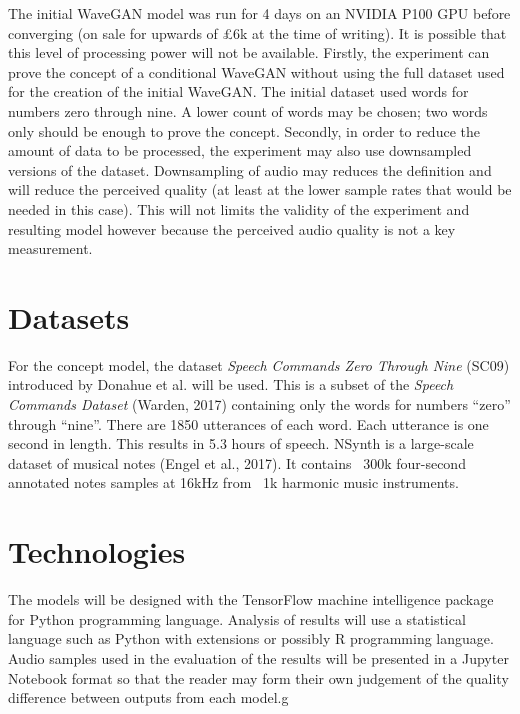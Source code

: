 \documentclass{article}
\begin{document}
The initial WaveGAN model was run for 4 days on an NVIDIA P100 GPU before converging (on sale for upwards of £6k at the time of writing).
It is possible that this level of processing power will not be available.
\newline
\newline
Firstly, the experiment can prove the concept of a conditional WaveGAN without using the full dataset used for the creation of the initial WaveGAN.
The initial dataset used words for numbers zero through nine.
A lower count of words may be chosen; two words only should be enough to prove the concept.
\newline
\newline
Secondly, in order to reduce the amount of data to be processed, the experiment may also use downsampled versions of the dataset.
Downsampling of audio may reduces the definition and will reduce the perceived quality (at least at the lower sample rates that would be needed in this case).
This will not limits the validity of the experiment and resulting model however because the perceived audio quality is not a key measurement.

\section{Datasets}

For the concept model, the dataset \textit{Speech Commands Zero Through Nine} (SC09) introduced by Donahue et al. will be used.
This is a subset of the \textit{Speech Commands Dataset} (Warden, 2017) containing only the words for numbers ``zero'' through ``nine''.
There are 1850 utterances of each word.
Each utterance is one second in length.
This results in 5.3 hours of speech.
\newline
\newline
NSynth is a large-scale dataset of musical notes (Engel et al., 2017).
It contains ~300k four-second annotated notes samples at 16kHz from ~1k harmonic music instruments.

\section{Technologies}

The models will be designed with the TensorFlow machine intelligence package for Python programming language.
Analysis of results will use a statistical language such as Python with extensions or possibly R programming language.
Audio samples used in the evaluation of the results will be presented in a Jupyter Notebook format so that the reader may form their own judgement of the quality difference between outputs from each model.g
\end{document}
